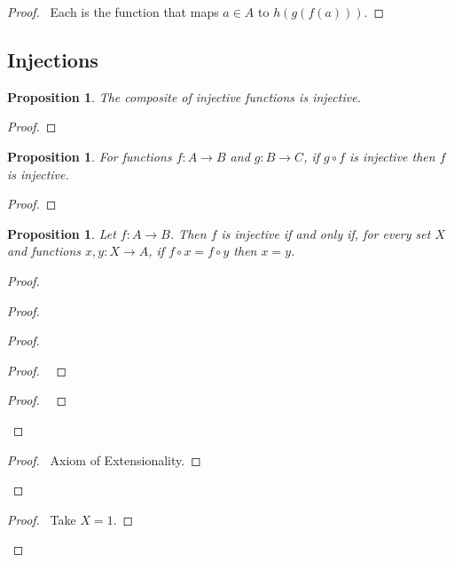 \documentclass{book}
\let\qed\relax
\newtheorem{prop}[ax]{Proposition}
\theoremstyle{definition}
\begin{document}
\begin{proof}
\pf\ Each is the function that maps $a \in A$ to $h(g(f(a)))$. \qed
\end{proof}

\subsection{Injections}

\begin{prop}
\label{prop:comp_inj}
The composite of injective functions is injective.
\end{prop}

\begin{proof}
\pf
{}
\qed
\end{proof}

\begin{prop}
For functions $f : A \rightarrow B$ and $g : B \rightarrow C$, if $g \circ f$ is injective then $f$ is injective.
\end{prop}

\begin{proof}
\pf
{}
\qed
\end{proof}

\begin{prop}
\label{prop:injective}
Let $f : A \rightarrow B$. Then $f$ is injective if and only if, for every set $X$ and functions $x,y : X \rightarrow A$, if $f \circ x = f \circ y$ then $x = y$.
\end{prop}

\begin{proof}
\pf
{}
\begin{proof}
	\begin{proof}
		\begin{proof}
			\pf\ 
		\end{proof}
		\begin{proof}
			\pf\ 
		\end{proof}
	\end{proof}
	\begin{proof}
		\pf\ Axiom of Extensionality.
	\end{proof}
\end{proof}
\begin{proof}
	\pf\ Take $X = 1$.
\end{proof}
\qed
\end{proof}
\end{document}
